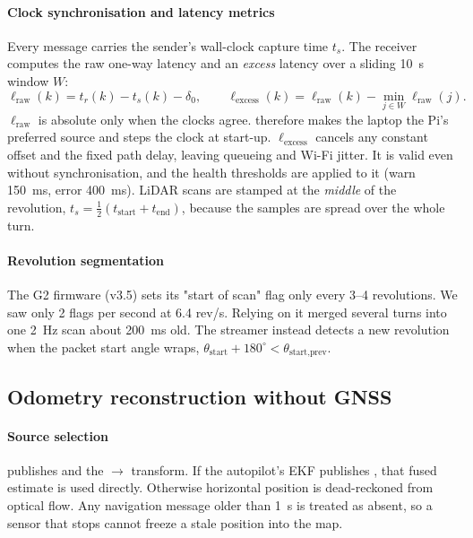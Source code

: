\paragraph{Clock synchronisation and latency metrics} Every message carries the
sender's wall-clock capture time $t_s$. The receiver computes the raw one-way latency
and an \emph{excess} latency over a sliding \SI{10}{\second} window $W$:
\begin{equation}
  \ell_\text{raw}(k) = t_r(k) - t_s(k) - \delta_0, \qquad
  \ell_\text{excess}(k) = \ell_\text{raw}(k) - \min_{j\in W}\ell_\text{raw}(j).
  \label{eq:latency}
\end{equation}
$\ell_\text{raw}$ is absolute only when the clocks agree. 
therefore makes the laptop the Pi's preferred  \cite{mills1991ntp}
source and steps the clock at start-up. $\ell_\text{excess}$ cancels any constant
offset and the fixed path delay, leaving queueing and Wi-Fi jitter. It is valid even
without synchronisation, and the health thresholds are applied to it
(warn \SI{150}{\milli\second}, error \SI{400}{\milli\second}). LiDAR scans are stamped
at the \emph{middle} of the revolution, $t_s=\tfrac12(t_\text{start}+t_\text{end})$,
because the samples are spread over the whole turn.

\paragraph{Revolution segmentation} The G2 firmware (v3.5) sets its "start of scan"
flag only every 3--4 revolutions. We saw only 2 flags per second at 6.4 rev/s. Relying on it merged several turns into one \SI{2}{\hertz} scan about
\SI{200}{\milli\second} old. The streamer instead detects a new revolution when the
packet start angle wraps, $\theta_\text{start} + 180^\circ < \theta_\text{start,prev}$.

\subsection{Odometry reconstruction without GNSS}
\label{sec:design-odom}

\paragraph{Source selection}  publishes
 and the $\rightarrow$ transform. If the
autopilot's EKF publishes , that fused estimate is used
directly. Otherwise horizontal position is dead-reckoned from optical flow. Any
navigation message older than \SI{1}{\second} is treated as absent, so a sensor that
stops cannot freeze a stale position into the map.

